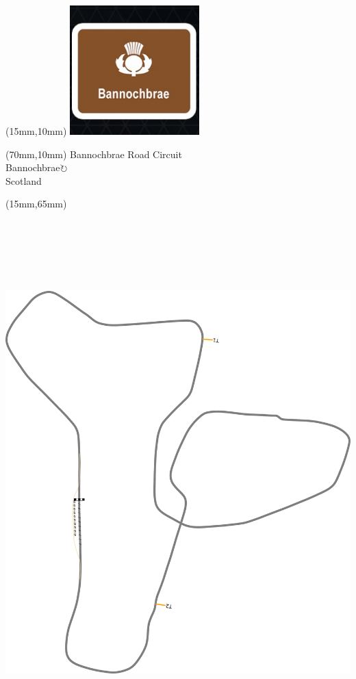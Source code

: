 \null\newpage
\begin{textblock*}{50mm}(15mm,10mm)%
\includegraphics[width=50mm]{LG/BANN.png}
\end{textblock*}
\begin{textblock*}{130mm}(70mm,10mm)%
{\fontsize{20}{20}\selectfont Bannochbrae Road Circuit\\}
{\fontsize{16}{16}\selectfont Bannochbrae\hfill \Large$\circlearrowright$\\}
{\fontsize{12}{12}\selectfont Scotland\\}
\end{textblock*}
\begin{textblock*}{185mm}(15mm,65mm)%
\centering
\mbox{\includegraphics[width=185mm,height=210mm,keepaspectratio]{PT/BANNRC.pdf}}
\end{textblock*}
